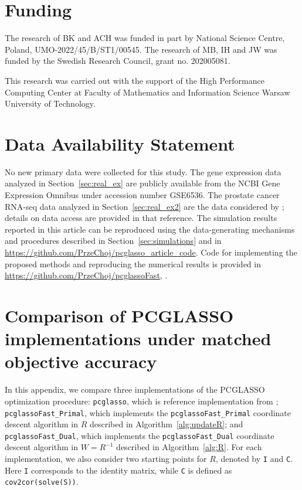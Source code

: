 \documentclass[12pt]{amsart}
\numberwithin{equation}{section}
\numberwithin{equation}{section}
\theoremstyle{plain}
\theoremstyle{definition}
\begin{document}
\section*{Funding}
The research of BK and ACH was funded in part by National Science Centre, Poland, UMO-2022/45/B/ST1/00545. The research of MB, IH and JW was funded by the Swedish Research Council, grant no. 202005081.

This research was carried out with the support of the High Performance Computing Center at Faculty of Mathematics and Information Science Warsaw University of Technology.


\section{Data Availability Statement}\label{data-availability-statement}

No new primary data were collected for this study. The gene expression data
analyzed in Section~\ref{sec:real_ex} are publicly available from the NCBI Gene
Expression Omnibus under accession number GSE6536. The prostate cancer RNA-seq
data analyzed in Section~\ref{sec:real_ex2} are the data considered by
\citet{HUB25}; details on data access are provided in that reference. The
simulation results reported in this article can be reproduced using the
data-generating mechanisms and procedures described in Section~\ref{sec:simulations}
and in \url{https://github.com/PrzeChoj/pcglasso_article_code}. Code for implementing the proposed methods and
reproducing the numerical results is provided in \url{https://github.com/PrzeChoj/pcglassoFast}, \cite{chojeckiwallin2025pcglassofast}.












\appendix

\section{Comparison of PCGLASSO implementations under matched objective accuracy}
\label{app:comparison_carter}

In this appendix, we compare three implementations of the PCGLASSO optimization procedure:
\texttt{pcglasso}, which is reference implementation from \cite{carter_arxiv_2025};
\texttt{pcglassoFast\_Primal}, which implements the \texttt{pcglassoFast\_Primal} coordinate descent algorithm in $R$ described in Algorithm~\ref{alg:updateR};
and \texttt{pcglassoFast\_Dual}, which implements the \texttt{pcglassoFast\_Dual} coordinate descent algorithm in $W = R^{-1}$ described in Algorithm~\ref{alg:R}.
For each implementation, we also consider two starting points for $R$, denoted by \texttt{I} and \texttt{C}. Here \texttt{I} corresponds to the identity matrix, while \texttt{C} is defined as \texttt{cov2cor(solve(S))}.
\end{document}
